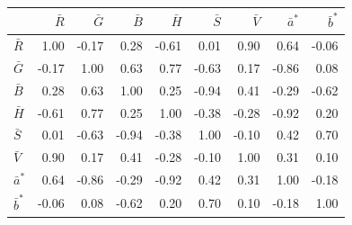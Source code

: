 \scriptsize
\begin{tabular}{lrrrrrrrr}
\toprule
 & $\bar R$ & $\bar G$ & $\bar B$ & $\bar H$ & $\bar S$ & $\bar V$ & $\bar a^*$ & $\bar b^*$ \\
\midrule
$\bar R$ & 1.00 & -0.17 & 0.28 & -0.61 & 0.01 & 0.90 & 0.64 & -0.06 \\
$\bar G$ & -0.17 & 1.00 & 0.63 & 0.77 & -0.63 & 0.17 & -0.86 & 0.08 \\
$\bar B$ & 0.28 & 0.63 & 1.00 & 0.25 & -0.94 & 0.41 & -0.29 & -0.62 \\
$\bar H$ & -0.61 & 0.77 & 0.25 & 1.00 & -0.38 & -0.28 & -0.92 & 0.20 \\
$\bar S$ & 0.01 & -0.63 & -0.94 & -0.38 & 1.00 & -0.10 & 0.42 & 0.70 \\
$\bar V$ & 0.90 & 0.17 & 0.41 & -0.28 & -0.10 & 1.00 & 0.31 & 0.10 \\
$\bar a^*$ & 0.64 & -0.86 & -0.29 & -0.92 & 0.42 & 0.31 & 1.00 & -0.18 \\
$\bar b^*$ & -0.06 & 0.08 & -0.62 & 0.20 & 0.70 & 0.10 & -0.18 & 1.00 \\
\bottomrule
\end{tabular}

